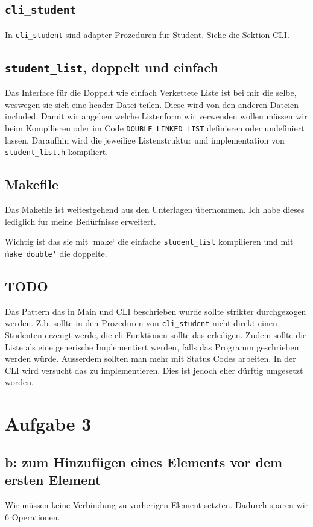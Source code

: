 \documentclass{article}
\begin{document}
\subsection{\texttt{cli\_student}}
In \texttt{cli\_student} sind adapter Prozeduren für Student. Siehe die Sektion CLI.

\subsection{\texttt{student\_list}, doppelt und einfach}
Das Interface für die Doppelt wie einfach Verkettete Liste ist bei mir die selbe, weswegen sie sich eine header Datei teilen.
Diese wird von den anderen Dateien included.
Damit wir angeben welche Listenform wir verwenden wollen müssen wir beim Kompilieren oder im Code \texttt{DOUBLE\_LINKED\_LIST} definieren oder undefiniert lassen.
Daraufhin wird die jeweilige Listenstruktur und implementation von \texttt{student\_list.h} kompiliert.

\subsection{Makefile}
Das Makefile ist weitestgehend aus den Unterlagen übernommen.
Ich habe dieses lediglich fur meine Bedürfnisse erweitert.

Wichtig ist das sie mit `make` die einfache \texttt{student\_list} kompilieren und mit \texttt{\'make double\'} die doppelte. 

\subsection{TODO}
Das Pattern das in Main und CLI beschrieben wurde sollte strikter durchgezogen werden.
Z.b. sollte in den Prozeduren von \texttt{cli\_student} nicht direkt einen Studenten erzeugt werde, die cli Funktionen sollte das erledigen.
Zudem sollte die Liste als eine generische Implementiert werden, falls das Programm geschrieben werden würde.
Ausserdem sollten man mehr mit Status Codes arbeiten. In der CLI wird versucht das zu implementieren. Dies ist jedoch eher dürftig umgesetzt worden.

\section{Aufgabe 3}    
\subsection{b: zum Hinzuf{\"u}gen eines Elements vor dem ersten Element}
Wir müssen keine Verbindung zu vorherigen Element setzten.
Dadurch sparen wir 6 Operationen.
\end{document}
